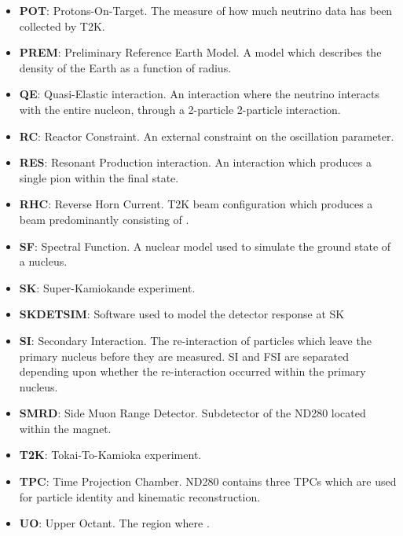 \begin{itemize}[label={},leftmargin=*]
\item \textbf{POT}: Protons-On-Target. The measure of how much neutrino data has been collected by T2K.
\item \textbf{PREM}: Preliminary Reference Earth Model. A model which describes the density of the Earth as a function of radius.
\item \textbf{QE}: Quasi-Elastic interaction. An interaction where the neutrino interacts with the entire nucleon, through a 2-particle \quickmath{\rightarrow} 2-particle interaction.
\item \textbf{RC}: Reactor Constraint. An external constraint on the  oscillation parameter.
\item \textbf{RES}: Resonant Production interaction. An interaction which produces a single pion within the final state.
\item \textbf{RHC}: Reverse Horn Current. T2K beam configuration which produces a beam predominantly consisting of \quickmath{\bar{\nu}_\mu}.
\item \textbf{SF}: Spectral Function. A nuclear model used to simulate the ground state of a nucleus.
\item \textbf{SK}: Super-Kamiokande experiment.
\item \textbf{SKDETSIM}: Software used to model the detector response at SK
\item \textbf{SI}: Secondary Interaction. The re-interaction of particles which leave the primary nucleus before they are measured. SI and FSI are separated depending upon whether the re-interaction occurred within the primary nucleus.
\item \textbf{SMRD}: Side Muon Range Detector. Subdetector of the ND280 located within the magnet.
\item \textbf{T2K}: Tokai-To-Kamioka experiment.
\item \textbf{TPC}: Time Projection Chamber. ND280 contains three TPCs which are used for particle identity and kinematic reconstruction.
\item \textbf{UO}: Upper Octant. The region where .

\end{itemize}

